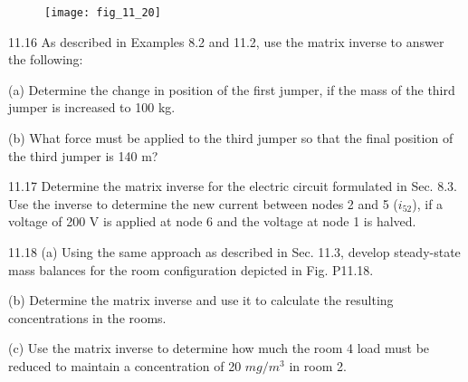 \documentclass[../main.tex]{subfiles}
\begin{document}
\begin{figure}[H]
	\centering
	\texttt{[image: fig\_11\_20]}
	\label{fig:fig_11_20}
\end{figure}


11.16 As described in Examples 8.2 and 11.2, use the matrix
inverse to answer the following:

(a) Determine the change in position of the first jumper, if
the mass of the third jumper is increased to 100 kg.

(b) What force must be applied to the third jumper so that
the final position of the third jumper is 140 m?


11.17 Determine the matrix inverse for the electric circuit
formulated in Sec. 8.3. Use the inverse to determine the new
current between nodes 2 and 5 ($i_{52}$), if a voltage of 200 V is
applied at node 6 and the voltage at node 1 is halved.


11.18 (a) Using the same approach as described in Sec. 11.3,
develop steady-state mass balances for the room configuration depicted in Fig. P11.18.

(b) Determine the matrix inverse and use it to calculate the
resulting concentrations in the rooms.

(c) Use the matrix inverse to determine how much the room
4 load must be reduced to maintain a concentration of
20 $mg/m^{3}$ in room 2.
\end{document}

